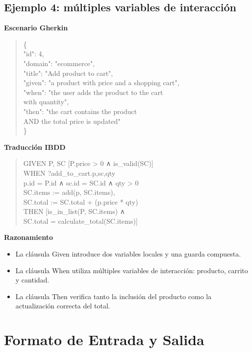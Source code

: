 \subsection{Ejemplo 4: múltiples variables de interacción}

\textbf{Escenario Gherkin}

\begin{quote}
\ttfamily\small
\{\\
\quad "id": 4,\\
\quad "domain": "ecommerce",\\
\quad "title": "Add product to cart",\\
\quad "given": "a product with price and a shopping cart",\\
\quad "when": "the user adds the product to the cart\\
\quad with quantity",\\
\quad "then": "the cart contains the product\\
\quad AND the total price is updated"\\
\}
\end{quote}

\textbf{Traducción IBDD}

\begin{quote}
\ttfamily\small
GIVEN P, SC [P.price > 0 ∧ is\_valid(SC)]\\
WHEN ?add\_to\_cart.p,sc,qty\\
\quad p.id = P.id ∧ sc.id = SC.id ∧ qty > 0\\
\quad SC.items := add(p, SC.items),\\
\quad SC.total := SC.total + (p.price * qty)\\
THEN [is\_in\_list(P, SC.items) ∧\\
\quad SC.total = calculate\_total(SC.items)]
\end{quote}

\textbf{Razonamiento}

\begin{itemize}
\item La cláusula Given introduce dos variables locales y una guarda compuesta.
\item La cláusula When utiliza múltiples variables de interacción: producto, carrito y cantidad.
\item La cláusula Then verifica tanto la inclusión del producto como la actualización correcta del total.
\end{itemize}

\section{Formato de Entrada y Salida}

